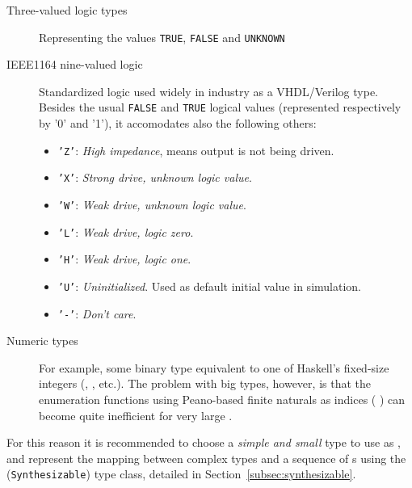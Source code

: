             \begin{description}
                \item[Three-valued logic types]
                    Representing the values \texttt{TRUE}, \texttt{FALSE} and \texttt{UNKNOWN}
                \item[IEEE1164 nine-valued logic]
                    Standardized logic used widely in industry as a VHDL/Verilog type.
                    Besides the usual \texttt{FALSE} and \texttt{TRUE} logical values
                    (represented respectively by '0' and '1'),
                    it accomodates also the following others:
                    \begin{itemize}
                        \item \texttt{'Z'}: \emph{High impedance}, means output is not being driven.
                        \item \texttt{'X'}: \emph{Strong drive, unknown logic value}.
                        \item \texttt{'W'}: \emph{Weak drive, unknown logic value}.
                        \item \texttt{'L'}: \emph{Weak drive, logic zero}.
                        \item \texttt{'H'}: \emph{Weak drive, logic one}.
                        \item \texttt{'U'}: \emph{Uninitialized}. Used as default initial value in simulation.
                        \item \texttt{'-'}: \emph{Don't care}.
                    \end{itemize}
                \item[Numeric types]
                    For example, some binary type equivalent to one of Haskell's fixed-size integers
                    (\texttt{}, \texttt{}, etc.).
                    The problem with big  types, however, is that the enumeration functions
                    using Peano-based finite naturals as indices ( ) can become quite
                    inefficient for very large .
            \end{description}

            For this reason it is recommended to choose a \emph{simple and small} type to use as ,
            and represent the mapping between complex types and a sequence of s using
            the  (\texttt{Synthesizable}) type class, detailed in Section~\ref{subsec:synthesizable}.


